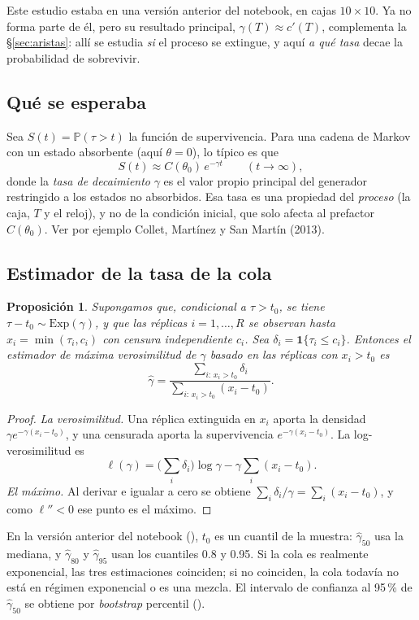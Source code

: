 \documentclass[11pt,a4paper]{article}
\theoremstyle{plain}
\newtheorem{proposicion}{Proposición}[section]
\theoremstyle{remark}
\newcommand{\fn}[1]{\texttt{\detokenize{#1}}}
\begin{document}
Este estudio estaba en una versión anterior del notebook, en cajas $10\times10$. Ya no forma parte de él, pero su resultado principal, $\gamma(T)\approx c'(T)$, complementa la \S\ref{sec:aristas}: allí se estudia \emph{si} el proceso se extingue, y aquí \emph{a qué tasa} decae la probabilidad de sobrevivir.

\subsection*{Qué se esperaba}

Sea $S(t)=\mathbb{P}(\tau>t)$ la función de supervivencia. Para una cadena de Markov con un estado absorbente (aquí $\theta=0$), lo típico es que
\[
S(t)\approx C(\theta_0)\,e^{-\gamma t}\qquad(t\to\infty),
\]
donde la \emph{tasa de decaimiento} $\gamma$ es el valor propio principal del generador restringido a los estados no absorbidos. Esa tasa es una propiedad del \emph{proceso} (la caja, $T$ y el reloj), y no de la condición inicial, que solo afecta al prefactor $C(\theta_0)$. Ver por ejemplo Collet, Martínez y San Martín (2013).

\subsection*{Estimador de la tasa de la cola}

\begin{proposicion}\label{prop:mle}
Supongamos que, condicional a $\tau>t_0$, se tiene $\tau-t_0\sim\mathrm{Exp}(\gamma)$, y que las réplicas $i=1,\dots,R$ se observan hasta $x_i=\min(\tau_i,c_i)$ con censura independiente $c_i$. Sea $\delta_i=\mathbf 1\{\tau_i\le c_i\}$. Entonces el estimador de máxima verosimilitud de $\gamma$ basado en las réplicas con $x_i>t_0$ es
\[
\hat\gamma=\frac{\sum_{i:\,x_i>t_0}\delta_i}{\sum_{i:\,x_i>t_0}(x_i-t_0)} .
\]
\end{proposicion}

\begin{proof}
\textit{La verosimilitud.} Una réplica extinguida en $x_i$ aporta la densidad $\gamma e^{-\gamma(x_i-t_0)}$, y una censurada aporta la supervivencia $e^{-\gamma(x_i-t_0)}$. La log-verosimilitud es
\[
\ell(\gamma)=\Big(\sum_i\delta_i\Big)\log\gamma-\gamma\sum_i(x_i-t_0).
\]
\textit{El máximo.} Al derivar e igualar a cero se obtiene $\sum_i\delta_i/\gamma=\sum_i(x_i-t_0)$, y como $\ell''<0$ ese punto es el máximo.
\end{proof}

En la versión anterior del notebook (\fn{tail_rate_mle}), $t_0$ es un cuantil de la muestra: $\hat\gamma_{50}$ usa la mediana, y $\hat\gamma_{80}$ y $\hat\gamma_{95}$ usan los cuantiles 0.8 y 0.95. Si la cola es realmente exponencial, las tres estimaciones coinciden; si no coinciden, la cola todavía no está en régimen exponencial o es una mezcla. El intervalo de confianza al 95\,\% de $\hat\gamma_{50}$ se obtiene por \emph{bootstrap} percentil (\fn{bootstrap_tail_rate}).
\end{document}

